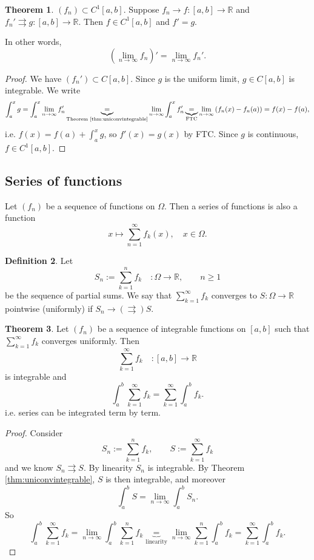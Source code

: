 \documentclass[a4paper]{article}
\theoremstyle{definition}
\newtheorem{defn}{Definition}[subsection]
\newtheorem{thm}[defn]{Theorem}
\begin{document}
\begin{thm}
\label{thm:interchalimwderiv}
$(f_n)\subset C^1 [a,b]$. Suppose $f_n \longrightarrow f:[a,b]\rightarrow \mathbb R$ and $f_n' \rightrightarrows g:[a,b]\rightarrow \mathbb R$. Then $f \in C^1 [a,b]$ and $f'=g$.

In other words,
\[
\left(\lim_{n\rightarrow \infty} f_n \right)' = \lim_{n\rightarrow \infty} f_n' .
\]
\end{thm}
\begin{proof}
We have $(f_n') \subset C[a,b]$. Since $g$ is the uniform limit, $g\in C[a,b]$ is integrable. We write
\[
\int_a^x g = \int_a^x \lim_{n\rightarrow \infty} f_n' \underbrace{=}_{\text{Theorem \ref{thm:uniconvintegrable}}} \lim_{n\rightarrow \infty} \int_a^x f_n' \underbrace{=}_{\text{FTC}} \lim_{n\rightarrow \infty} \left(f_n(x)-f_n(a)\right) = f(x)-f(a),
\]
i.e. $f(x)=f(a)+\int_a^x g$, so $f'(x)=g(x)$ by FTC. Since $g$ is continuous, $f\in C^1[a,b]$.
\end{proof}

\subsection{Series of functions}
Let $(f_n)$ be a sequence of functions on $\Omega$. Then a series of functions is also a function
\[
x\mapsto \sum_{n=1}^\infty f_k (x),\quad x\in \Omega .
\]
\begin{defn}
Let
\[
S_n := \sum_{k=1}^n f_k\quad :\Omega \rightarrow \mathbb R,\qquad n\geq 1
\]
be the sequence of partial sums. We say that $\displaystyle \sum_{k=1}^\infty f_k$ converges to $S:\Omega \rightarrow \mathbb R$ pointwise (uniformly) if $S_n\rightarrow (\rightrightarrows) S$.
\end{defn}

\begin{thm}
\label{thm:tbtint}
Let $(f_n)$ be a sequence of integrable functions on $[a,b]$ such that $\displaystyle \sum_{k=1}^\infty f_k$ converges uniformly. Then
\[
\sum_{k=1}^\infty f_k\quad :[a,b]\rightarrow \mathbb R
\]
is integrable and
\[
\int_a^b \sum_{k=1}^\infty f_k = \sum_{k=1}^\infty \int_a^b f_k .
\]
i.e. series can be integrated term by term.
\end{thm}
\begin{proof}
Consider
\[
S_n := \sum_{k=1}^n f_k,\qquad S:=\sum_{k=1}^\infty f_k
\]
and we know $S_n \rightrightarrows S$. By linearity $S_n$ is integrable. By Theorem \ref{thm:uniconvintegrable}, $S$ is then integrable, and moreover
\[
\int_a^b S = \lim_{n\rightarrow \infty}\int_a^b S_n .
\]
So
\[
\int_a^b \sum_{k=1}^\infty f_k = \lim_{n\rightarrow \infty} \int_a^b \sum_{k=1}^n f_k \underbrace{=}_{\text{linearity}} \lim_{n\rightarrow \infty} \sum_{k=1}^n \int_a^b f_k = \sum_{k=1}^\infty \int_a^b f_k .
\]
\end{proof}
\end{document}
